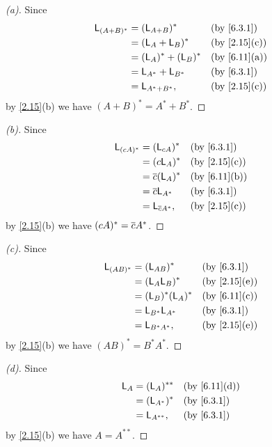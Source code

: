 \begin{proof}[(a)]
	Since
	\begin{align*}
		\L_{(A + B)^*} & = (\L_{A + B})^*      &  & \by{6.3.1}   \\
		               & = (\L_A + \L_B)^*     &  & \by{2.15}[c] \\
		               & = (\L_A)^* + (\L_B)^* &  & \by{6.11}[a] \\
		               & = \L_{A^*} + \L_{B^*} &  & \by{6.3.1}   \\
		               & = \L_{A^* + B^*},     &  & \by{2.15}[c]
	\end{align*}
	by \cref{2.15}(b) we have \((A + B)^* = A^* + B^*\).
\end{proof}

\begin{proof}[(b)]
	Since
	\begin{align*}
		\L_{(cA)^*} & = (\L_{cA})^*        &  & \by{6.3.1}   \\
		            & = (c \L_A)^*         &  & \by{2.15}[c] \\
		            & = \conj{c} (\L_A)^*  &  & \by{6.11}[b] \\
		            & = \conj{c} \L_{A^*}  &  & \by{6.3.1}   \\
		            & = \L_{\conj{c} A^*}, &  & \by{2.15}[c]
	\end{align*}
	by \cref{2.15}(b) we have \((cA)^* = \overline{c} A^*\).
\end{proof}

\begin{proof}[(c)]
	Since
	\begin{align*}
		\L_{(AB)^*} & = (\L_{AB})^*       &  & \by{6.3.1}   \\
		            & = (\L_A \L_B)^*     &  & \by{2.15}[e] \\
		            & = (\L_B)^* (\L_A)^* &  & \by{6.11}[c] \\
		            & = \L_{B^*} \L_{A^*} &  & \by{6.3.1}   \\
		            & = \L_{B^* A^*},     &  & \by{2.15}[e]
	\end{align*}
	by \cref{2.15}(b) we have \((AB)^* = B^* A^*\).
\end{proof}

\begin{proof}[(d)]
	Since
	\begin{align*}
		\L_A & = (\L_A)^{**}  &  & \by{6.11}[d] \\
		     & = (\L_{A^*})^* &  & \by{6.3.1}   \\
		     & = \L_{A^{**}}, &  & \by{6.3.1}
	\end{align*}
	by \cref{2.15}(b) we have \(A = A^{**}\).
\end{proof}

